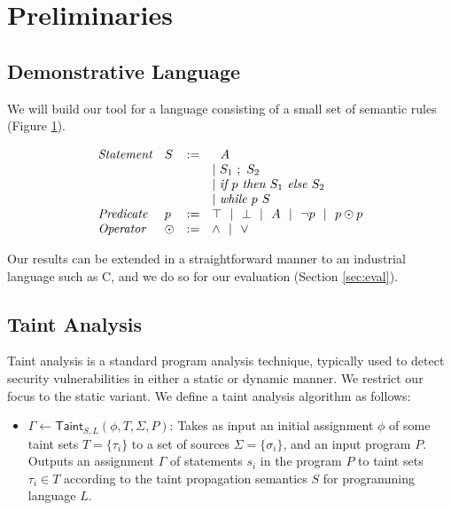 \documentclass[letterpaper,twocolumn,10pt]{article}
\begin{document}
\section{Preliminaries}

\subsection{Demonstrative Language}

We will build our tool for a language consisting of a small set of semantic rules (Figure \ref{fig:semrules}).

\begin{figure}
\caption{}
\label{fig:semrules}
\[
	\begin{array}{l l c l}
		\emph{Statement} & S & := & 
			\ \ A \\
			& & & |~ S_1\ ;\ S_2 \\
			& & & |~ \emph{if }p\emph{ then } S_1 \emph{ else } S_2 \\
			& & & |~ \emph{while }p\emph{ } S \\
		\emph{Predicate} & p &:=& \top ~~|~~ \bot ~~|~~ A ~~|~~ \lnot p ~~|~~ p \odot p \\
		\emph{Operator} & \odot &:=& \land ~~|~~ \lor \\
	\end{array}
\]
\end{figure}

Our results can be extended in a straightforward manner to an industrial language such as C, and we do so for our evaluation (Section \ref{sec:eval}).

\subsection{Taint Analysis}

Taint analysis is a standard program analysis technique, typically used to detect security vulnerabilities in either a static or dynamic manner. 
We restrict our focus to the static variant. We define a taint analysis algorithm as follows:

\begin{itemize}
    \item $\Gamma \gets \mathsf{Taint}_{S,L}(\phi, T, \Sigma, P)$: Takes as input an initial assignment $\phi$ of some taint sets $T = \{\tau_i\}$ to 
    a set of sources $\Sigma = \{\sigma_i\}$, and an input program $P$. Outputs an 
    assignment $\Gamma$ of statements $s_i$ in the program $P$ to taint sets $\tau_i \in T$ according to the taint propagation semantics $S$ for programming
    language $L$.
\end{itemize}
\end{document}
